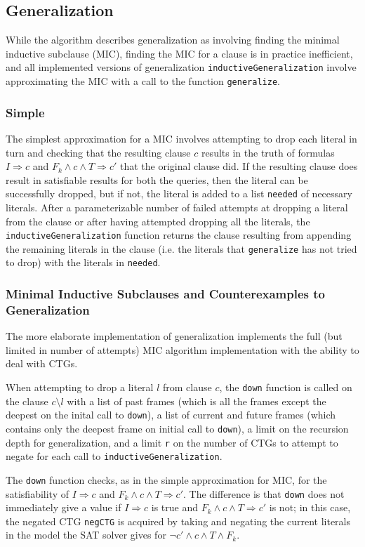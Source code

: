 \documentclass[12pt,a4paper,twoside,openright]{report}
\begin{document}
\subsection{Generalization}
While the algorithm describes generalization as involving finding the minimal inductive subclause (MIC),
finding the MIC for a clause is in practice inefficient, and all implemented versions of generalization
\verb,inductiveGeneralization, involve approximating the MIC with a call to the function
\verb,generalize,.

\subsubsection{Simple}
The simplest approximation for a MIC involves attempting to drop each literal in turn and checking
that the resulting clause $c$ results in the truth of formulas $I \Rightarrow c$ and
$F_k \wedge c \wedge T \Rightarrow c'$ that the original clause did. If the resulting clause
does result in satisfiable results for both the queries, then the literal can be successfully dropped,
but if not, the literal is added to a list \verb,needed, of necessary literals.
After a parameterizable number of failed attempts at dropping a literal from the clause or after
having attempted dropping all the literals, the
\verb,inductiveGeneralization, function returns the clause resulting from appending the remaining
literals in the clause (i.e. the literals that \verb,generalize, has not tried to drop)
with the literals in \verb,needed,.

\subsubsection{Minimal Inductive Subclauses and Counterexamples to Generalization}
The more elaborate implementation of generalization implements the full
(but limited in number of attempts) MIC algorithm implementation with the ability to deal with CTGs.

When attempting to drop a literal $l$ from clause $c$, the \verb,down, function is called on the clause
$c \setminus l$ with a list of past frames (which is all the frames except the deepest on the inital call
to \verb,down,), a list of current and future frames (which contains only the deepest frame on initial call
to \verb,down,), a limit on the recursion depth for generalization, and a limit \verb,r, on the number
of CTGs to attempt to negate for each call to \verb,inductiveGeneralization,.

The \verb,down, function checks, as in the simple approximation for MIC, for the satisfiability of
$I \Rightarrow c$ and $F_k \wedge c \wedge T \Rightarrow c'$. The difference is that \verb,down,
does not immediately give a value if $I \Rightarrow c$ is true and $F_k \wedge c \wedge T \Rightarrow c'$ is
not; in this case, the negated CTG \verb,negCTG, is acquired by taking and negating the current literals in
the model the SAT solver gives for $\neg c' \wedge c \wedge T \wedge F_k$.
\end{document}
